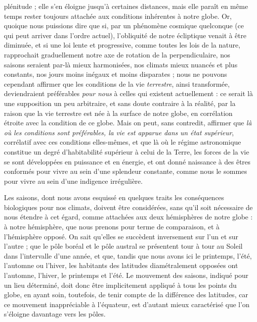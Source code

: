 \documentclass[a4paper, 11pt, oneside, landscape]{article}
\begin{document}
plénitude ; elle s'en éloigne jusqu'à certaines distances, mais elle paraît en même temps rester toujours attachée aux conditions inhérentes à notre globe. Or, quoique nous puissions dire que si, par un phénomène cosmique quelconque (ce qui peut arriver dans l'ordre actuel), l'obliquité de notre écliptique venait à être diminuée, et si une loi lente et progressive, comme toutes les lois de la nature, rapprochait graduellement notre axe de rotation de la perpendiculaire, nos saisons seraient par-là mieux harmonisées, nos climats mieux nuancés et plus constants, nos jours moins inégaux et moins disparates ; nous ne pouvons cependant affirmer que les conditions de la vie \emph{terrestre}, ainsi transformée, deviendraient préférables \emph{pour nous} à celles qui existent actuellement : ce serait là une supposition un peu arbitraire, et sans doute contraire à la réalité, par la raison que la vie terrestre est née à la surface de notre globe, en corrélation étroite avec la condition de ce globe. Mais on peut, sans contredit, affirmer que \emph{là où les conditions sont préférables, la vie est apparue dans un état supérieur}, corrélatif avec ces conditions elles-mêmes, et que là où le régime astronomique constitue un degré d'habitabilité supérieur à celui de la Terre, les forces de la vie se sont développées en puissance et en énergie, et ont donné naissance à des êtres conformés pour vivre au sein d'une splendeur constante, comme nous le sommes pour vivre au sein d'une indigence irrégulière.

Les saisons, dont nous avons esquissé en quelques traits les conséquences biologiques pour nos climats, doivent être considérées, sans qu'il soit nécessaire de nous étendre à cet égard, comme attachées aux deux hémisphères de notre globe : à notre hémisphère, que nous prenons pour terme de comparaison, et à l'hémisphère opposé. On sait qu'elles se succèdent inversement sur l'un et sur l'autre ; que le pôle boréal et le pôle austral se présentent tour à tour au Soleil dans l'intervalle d'une année, et que, tandis que nous avons ici le printemps, l'été, l'automne ou l'hiver, les habitants des latitudes diamétralement opposées ont l'automne, l'hiver, le printemps et l'été. Le mouvement des saisons, indiqué pour un lieu déterminé, doit donc être implicitement appliqué à tous les points du globe, en ayant soin, toutefois, de tenir compte de la différence des latitudes, car ce mouvement inappréciable à l'équateur, est d'autant mieux caractérisé que l'on s'éloigne davantage vers les pôles.
\end{document}

